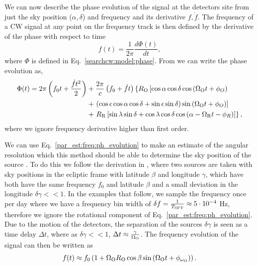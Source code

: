 We can now describe the phase evolution of the signal at the detectors site from just the sky position ($\alpha, \delta$) and frequency and its derivative $f,\dot{f}$. 
The frequency of a \gls{CW} signal at any point on the frequency track is then defined by the derivative of the phase with respect to time
\begin{equation}
    f(t) = \frac{1}{2\pi}\frac{d\Phi(t)}{dt}, 
\end{equation}
where $\Phi$ is defined in Eq.~\ref{searchcw:model:phase}.
From \citep{schutz1998DataAnalysis} we can write the phase evolution as,
\begin{equation}
    \label{par_est:freq:ph_evolution}
    \begin{split}
        \Phi(t) = 2\pi \left(  f_0 t + \frac{\dot{f} t^2}{2} \right) &+ \frac{2\pi}{c} \left(  f_0 + \dot{f}t  \right) \left\{ R_{\rm{O}} \left[ \cos \alpha \cos \delta \cos \left( \Omega_{\mathrm{O}} t + \phi_{O}  \right) \right. \right. \\ 
        &+ \left. \left( \cos \epsilon \cos \alpha \cos \delta +  \sin \epsilon \sin \delta \right) \sin \left( \Omega_{\mathrm{O}} t + \phi_{O}  \right) \right] \\
        &+ \left. R_{\rm{R}} \left[ \sin \lambda \sin \delta + \cos \lambda \cos \delta \cos \left( \alpha - \Omega_{\mathrm{R}} t - \phi_{R}  \right)     \right] \right\},
    \end{split}
\end{equation}
where we ignore frequency derivative higher than first order.

We can use Eq.~\ref{par_est:freq:ph_evolution} to make an estimate of the angular resolution which this method should be able to determine the sky position of the source .
To do this we follow the derivation in \citep{astone2014MethodAllsky}, where two sources are taken with sky positions in the ecliptic frame with latitude $\beta$ and longitude $\gamma$, which have both have the same frequency $f_0 $ and latitude $\beta$ and a small deviation in the longitude $\delta \gamma << 1$.
In the examples that follow, we sample the frequency once per day where we have a frequency bin width of $\delta f = \frac{1}{T_{\rm{SFT}}} \approx 5 \cdot 10^{-4}$ Hz, therefore we ignore the rotational component of Eq.~\ref{par_est:freq:ph_evolution}.
Due to the motion of the detectors, the separation of the sources $\delta \gamma$ is seen as a time delay $\Delta t$, where as $\delta \gamma << 1$, $\Delta t \approx \frac{\gamma}{\Omega_{\rm{O}}}$.
The frequency evolution of the signal can then be written as
\begin{equation}
    f(t) \approx f_0 \left( 1 + \Omega_{\rm{O}} R_{\rm{O}} \cos \beta \sin \left( \Omega_{\mathrm{O}} t + \phi_{\omega_{O}}  \right) \right).
\end{equation}

